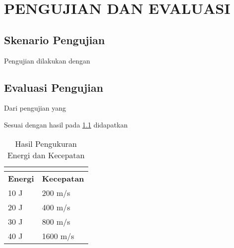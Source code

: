\chapter{PENGUJIAN DAN EVALUASI}
\vspace{4ex}

\setlength{\parindent}{7ex}

\section{Skenario Pengujian}
\vspace{1ex}

Pengujian dilakukan dengan \lipsum[1]
\vspace{0.5ex}

\lipsum[2]
\vspace{0.5ex}

\newpage

\section{Evaluasi Pengujian}
\vspace{1ex}

Dari pengujian yang \lipsum[3]
\vspace{0.5ex}

Sesuai dengan hasil pada \ref{tb:energiKecepatan} didapatkan \lipsum[4]

\begin{longtable}{|l|l|}
	\caption{Hasil Pengukuran Energi dan Kecepatan}
	\vspace{1.5ex}
	\label{tb:energiKecepatan}\\
	\hline
	\rowcolor[HTML]{C0C0C0}
	\textbf{Energi} & \textbf{Kecepatan} \\ \hline
	10 J & 200 m/s \\ \hline
	20 J & 400 m/s \\ \hline
	30 J & 800 m/s \\ \hline
	40 J & 1600 m/s \\ \hline
\end{longtable}
\vspace{1ex}

\lipsum[5]
\vspace{0.5ex}